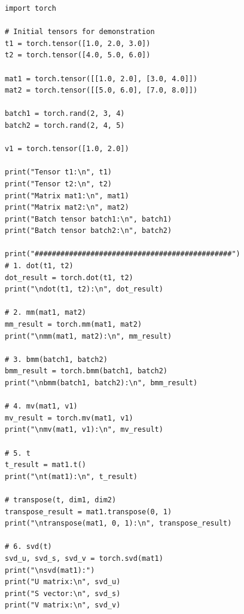 \begin{lstlisting}[style=pythonstyle]
import torch

# Initial tensors for demonstration
t1 = torch.tensor([1.0, 2.0, 3.0])
t2 = torch.tensor([4.0, 5.0, 6.0])

mat1 = torch.tensor([[1.0, 2.0], [3.0, 4.0]])
mat2 = torch.tensor([[5.0, 6.0], [7.0, 8.0]])

batch1 = torch.rand(2, 3, 4)
batch2 = torch.rand(2, 4, 5)

v1 = torch.tensor([1.0, 2.0])

print("Tensor t1:\n", t1)
print("Tensor t2:\n", t2)
print("Matrix mat1:\n", mat1)
print("Matrix mat2:\n", mat2)
print("Batch tensor batch1:\n", batch1)
print("Batch tensor batch2:\n", batch2)

print("##############################################")
# 1. dot(t1, t2)
dot_result = torch.dot(t1, t2)
print("\ndot(t1, t2):\n", dot_result)

# 2. mm(mat1, mat2)
mm_result = torch.mm(mat1, mat2)
print("\nmm(mat1, mat2):\n", mm_result)

# 3. bmm(batch1, batch2)
bmm_result = torch.bmm(batch1, batch2)
print("\nbmm(batch1, batch2):\n", bmm_result)

# 4. mv(mat1, v1)
mv_result = torch.mv(mat1, v1)
print("\nmv(mat1, v1):\n", mv_result)

# 5. t
t_result = mat1.t()
print("\nt(mat1):\n", t_result)

# transpose(t, dim1, dim2)
transpose_result = mat1.transpose(0, 1)
print("\ntranspose(mat1, 0, 1):\n", transpose_result)

# 6. svd(t)
svd_u, svd_s, svd_v = torch.svd(mat1)
print("\nsvd(mat1):")
print("U matrix:\n", svd_u)
print("S vector:\n", svd_s)
print("V matrix:\n", svd_v)
\end{lstlisting}
